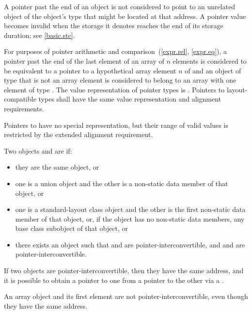 \begin{note}
A pointer past the end of an object
is not considered to point to an unrelated object
of the object's type
that might be located at that address.
A pointer value becomes invalid
when the storage it denotes
reaches the end of its storage duration;
see \ref{basic.stc}.
\end{note}
For purposes of pointer arithmetic
and comparison~(\ref{expr.rel}, \ref{expr.eq}),
a pointer past the end of the last element of
an array  of $n$ elements
is considered to be equivalent to
a pointer to a hypothetical array element $n$ of  and
an object of type  that is not an array element
is considered to belong to an array with one element of type .
The value representation of
pointer types is . Pointers to
layout-compatible types shall
have the same value representation and alignment
requirements.
\begin{note}
Pointers to  have no special
representation, but their range of valid values is restricted by the extended
alignment requirement.
\end{note}

\pnum
Two objects  and  are  if:
\begin{itemize}
\item
they are the same object, or
\item
one is a union object and
the other is a non-static data member of that object, or
\item
one is a standard-layout class object and
the other is the first non-static data member of that object, or,
if the object has no non-static data members,
any base class subobject of that object, or
\item
there exists an object  such that
 and  are pointer-interconvertible, and
 and  are pointer-interconvertible.
\end{itemize}
If two objects are pointer-interconvertible,
then they have the same address,
and it is possible to obtain a pointer to one
from a pointer to the other
via a .
\begin{note}
An array object and its first element are not pointer-interconvertible,
even though they have the same address.
\end{note}

